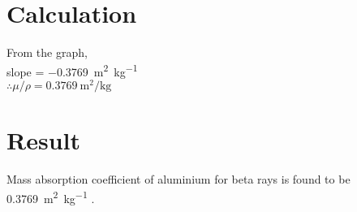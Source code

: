 \section{Calculation}
\noindent From the graph,\\
slope = \SI{-0.3769}{\meter\squared\per\kilo\gram}\\
$ \therefore \boxed{\mu/\rho =  \SI{0.3769}{\meter\squared\per\kilo\gram}} $

\section{Result}
Mass absorption coefficient of aluminium for beta rays is found to be \SI{0.3769}{\meter\squared\per\kilo\gram} .


